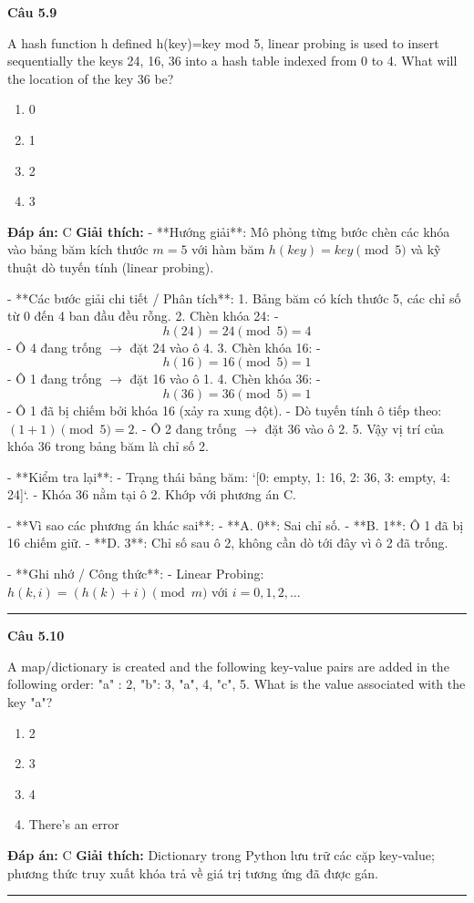 \documentclass[11pt,a4paper]{article}
\newenvironment{question}[1]{%
  \par\vspace{1em}\noindent\textbf{\large Câu #1}\par\vspace{0.4em}
}{%
  \par\vspace{1em}\hrule\vspace{0.6em}
}
\newenvironment{choices}{%
  \begin{enumerate}[label=\textbf{\Alph*.},leftmargin=2.2em,itemsep=2pt,topsep=3pt]
}{%
  \end{enumerate}
}
\newcommand{\choice}{\item}
\begin{document}
\begin{question}{5.9}
A hash function h defined h(key)=key mod 5, linear probing is used to insert sequentially the keys 24, 16, 36 into a hash table indexed from 0 to 4. What will the location of the key 36 be?
\begin{choices}
\choice 0
\choice 1
\choice 2
\choice 3
\end{choices}
\textbf{Đáp án:} C
\textbf{Giải thích:} - **Hướng giải**:
  Mô phỏng từng bước chèn các khóa vào bảng băm kích thước \(m = 5\) với hàm băm \(h(key) = key \pmod 5\) và kỹ thuật dò tuyến tính (linear probing).

- **Các bước giải chi tiết / Phân tích**:
  1. Bảng băm có kích thước 5, các chỉ số từ 0 đến 4 ban đầu đều rỗng.
  2. Chèn khóa 24:
     - \[ h(24) = 24 \pmod 5 = 4 \]
     - Ô 4 đang trống \(\rightarrow\) đặt 24 vào ô 4.
  3. Chèn khóa 16:
     - \[ h(16) = 16 \pmod 5 = 1 \]
     - Ô 1 đang trống \(\rightarrow\) đặt 16 vào ô 1.
  4. Chèn khóa 36:
     - \[ h(36) = 36 \pmod 5 = 1 \]
     - Ô 1 đã bị chiếm bởi khóa 16 (xảy ra xung đột).
     - Dò tuyến tính ô tiếp theo: \((1 + 1) \pmod 5 = 2\).
     - Ô 2 đang trống \(\rightarrow\) đặt 36 vào ô 2.
  5. Vậy vị trí của khóa 36 trong bảng băm là chỉ số 2.

- **Kiểm tra lại**:
  - Trạng thái bảng băm: `[0: empty, 1: 16, 2: 36, 3: empty, 4: 24]`.
  - Khóa 36 nằm tại ô 2. Khớp với phương án C.

- **Vì sao các phương án khác sai**:
  - **A. 0**: Sai chỉ số.
  - **B. 1**: Ô 1 đã bị 16 chiếm giữ.
  - **D. 3**: Chỉ số sau ô 2, không cần dò tới đây vì ô 2 đã trống.

- **Ghi nhớ / Công thức**:
  - Linear Probing: \(h(k, i) = (h(k) + i) \pmod m\) với \(i = 0, 1, 2, \dots\)
\end{question}

\begin{question}{5.10}
A map/dictionary is created and the following key-value pairs are added in the following order: "a" : 2, "b": 3, "a", 4, "c", 5. What is the value associated with the key "a"?
\begin{choices}
\choice 2
\choice 3
\choice 4
\choice There's an error
\end{choices}
\textbf{Đáp án:} C
\textbf{Giải thích:} Dictionary trong Python lưu trữ các cặp key-value; phương thức truy xuất khóa trả về giá trị tương ứng đã được gán.
\end{question}
\end{document}
